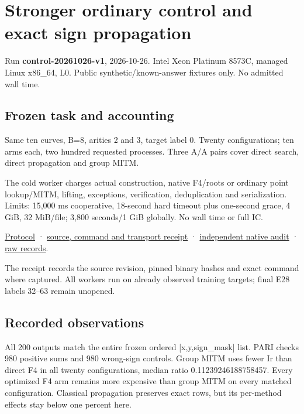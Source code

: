 \documentclass[
  10pt,
]{article}
\author{}
\date{}
\begin{document}
\section{Stronger ordinary control and exact sign
propagation}\label{stronger-ordinary-control-and-exact-sign-propagation}

Run \textbf{control-20261026-v1}, 2026-10-26. Intel Xeon Platinum 8573C,
managed Linux x86\_64, L0. Public synthetic/known-answer fixtures only.
No admitted wall time.

\subsection{Frozen task and
accounting}\label{frozen-task-and-accounting}

Same ten curves, B=8, arities 2 and 3, target label 0. Twenty
configurations; ten arms each, two hundred requested processes. Three
A/A pairs cover direct search, direct propagation and group MITM.

The cold worker charges actual construction, native F4/roots or ordinary
point lookup/MITM, lifting, exceptions, verification, deduplication and
serialization. Limits: 15,000 ms cooperative, 18-second hard timeout
plus one-second grace, 4 GiB, 32 MiB/file; 3,800 seconds/1 GiB globally.
No wall time or full IC.

\href{../../../execution-v3/CONTROL_PROTOCOL_V1.md}{Protocol} ·
\href{../../../execution-v3/runs/control-20261026-v1.transport.json}{source,
command and transport receipt} ·
\href{../../../execution-v3/control-audit-20261026-v2/AUDIT.json}{independent
native audit} ·
\href{../../../execution-v3/runs/control-20261026-v1/RECORDS.json}{raw
records}.

The receipt records the source revision, pinned binary hashes and exact
command where captured. All workers run on already observed training
targets; final E28 labels 32--63 remain unopened.

\subsection{Recorded observations}\label{recorded-observations}

All 200 outputs match the entire frozen ordered {[}x,y,sign\_mask{]}
list. PARI checks 980 positive sums and 980 wrong-sign controls. Group
MITM uses fewer Ir than direct F4 in all twenty configurations, median
ratio 0.11239246188758457. Every optimized F4 arm remains more expensive
than group MITM on every matched configuration. Classical propagation
preserves exact rows, but its per-method effects stay below one percent
here.
\end{document}
